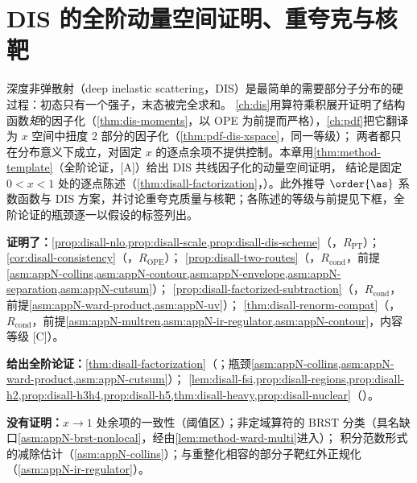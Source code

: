 \chapter{DIS 的全阶动量空间证明、重夸克与核靶}\label{ch:disall}

深度非弹散射（deep inelastic scattering，DIS）是最简单的需要部分子分布的硬过程：初态只有一个强子，末态被完全求和。
\cref{ch:dis}用算符乘积展开证明了结构函数\emph{矩}的因子化（\cref{thm:dis-moments}，以 OPE 为前提而严格），\cref{ch:pdf}把它翻译为 $x$ 空间中扭度 2 部分的因子化（\cref{thm:pdf-dis-xspace}，同一等级）；
两者都只在分布意义下成立，对固定 $x$ 的逐点余项不提供控制。本章用\cref{thm:method-template}（全阶论证，[A]）给出 DIS 共线因子化的动量空间证明，
结论是固定 $0<x<1$ 处的逐点陈述（\cref{thm:disall-factorization}，\tagA）。此外推导 $\order{\as}$ 系数函数与 DIS 方案，并讨论重夸克质量与核靶；各陈述的等级与前提见下框，全阶论证的瓶颈逐一以假设的标签列出。

\begin{tcolorbox}[enhanced,breakable,title=本章证明了什么／没有证明什么,fonttitle=\bfseries,
  colback=gray!3!white,colframe=gray!55!black,boxrule=0.6pt,arc=2pt,
  left=5pt,right=5pt,top=3pt,bottom=3pt,before skip=6pt,after skip=6pt]
\textbf{证明了：}\cref{prop:disall-nlo,prop:disall-scale,prop:disall-dis-scheme}（\tagR，$R_{\mathrm{PT}}$）；\cref{cor:disall-consistency}（\tagR，$R_{\mathrm{OPE}}$）；
\cref{prop:disall-two-routes}（\tagR，$R_{\mathrm{cond}}$，前提\cref{asm:appN-collins,asm:appN-contour,asm:appN-envelope,asm:appN-separation,asm:appN-cutsum}）；
\cref{prop:disall-factorized-subtraction}（\tagR，$R_{\mathrm{cond}}$，前提\cref{asm:appN-ward-product,asm:appN-uv}）；
\cref{thm:disall-renorm-compat}（\tagR，$R_{\mathrm{cond}}$，前提\cref{asm:appN-multren,asm:appN-ir-regulator,asm:appN-contour}，内容等级 [C]）。\par
\textbf{给出全阶论证：}\cref{thm:disall-factorization}（\tagA；瓶颈\cref{asm:appN-collins,asm:appN-ward-product,asm:appN-cutsum}）；
\cref{lem:disall-fsi,prop:disall-regions,prop:disall-h2,prop:disall-h3h4,prop:disall-h5,thm:disall-heavy,prop:disall-nuclear}（\tagA）。\par
\textbf{没有证明：}$x\to1$ 处余项的一致性（阈值区）；非定域算符的 BRST 分类（具名缺口\cref{asm:appN-brst-nonlocal}，经由\cref{lem:method-ward-multi}进入）；
积分范数形式的减除估计（\cref{asm:appN-collins}）；与重整化相容的部分子靶红外正规化（\cref{asm:appN-ir-regulator}）。
\end{tcolorbox}

